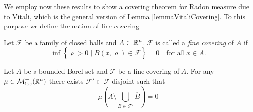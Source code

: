 We employ now these results to show a covering theorem for Radon measure due to Vitali, which is the general version of Lemma \ref{lemmaVitaliCovering}. To this purpose we define the notion of fine covering.

\begin{definition}
Let $\mathcal{F}$ be a family of closed balls and $A \subset \mathbb{R}^n$.
$\mathcal{F}$ is called a {\em fine covering} of $A$ if 
\[
\inf \left\{ \varrho > 0 \mid \overline{B(x,\varrho)} \in \mathcal{F}\right \} =
0 \quad \text{for all $x\in A$}.
\]
\end{definition}

\begin{theorem} \label{thm:Vitali_covering_theorem}
Let $A$ be a bounded Borel set and $\mathcal{F}$ be a fine covering of $A$. For any $\mu \in \mathcal{M}^+_{\rm loc}(\mathbb{R}^n)$ there exists $\mathcal{F}' \subset
\mathcal{F}$ disjoint such that 
\[
\mu \left( A \setminus \bigcup_{\overline{B}
\in \mathcal{F}'} \overline{B} \right) = 0
\]
\end{theorem}
